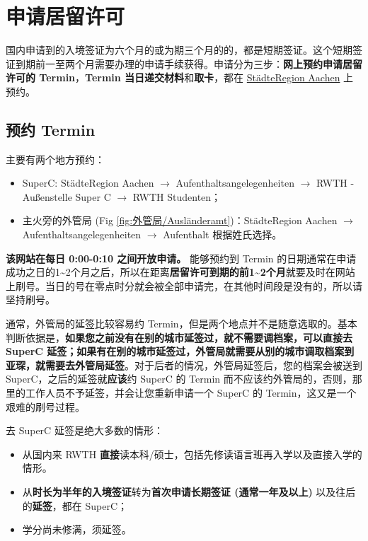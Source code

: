 \section{申请居留许可}\label{sec:申请居留许可}

  国内申请到的入境签证为六个月的或为期三个月的的，都是短期签证。这个短期签证到期前一至两个月需要办理的申请手续获得。申请分为三步：\textbf{网上预约申请居留许可的 Termin}，\textbf{Termin 当日递交材料}和\textbf{取卡}，都在 \href{https://termine.staedteregion-aachen.de/auslaenderamt/}{StädteRegion Aachen} 上预约。

  \subsection{预约 Termin}\label{subsec:预约 Termin}

    主要有两个地方预约：

    \begin{itemize}
      \item SuperC: StädteRegion Aachen $\rightarrow$ Aufenthaltsangelegenheiten $\rightarrow$ RWTH - Außenstelle Super C $\rightarrow$ RWTH Studenten；
      \item 主火旁的外管局 (Fig \ref{fig:外管局/Ausländeramt})：StädteRegion Aachen $\rightarrow$ Aufenthaltsangelegenheiten $\rightarrow$ Aufenthalt 根据姓氏选择。
    \end{itemize}

    \textbf{该网站在每日 0:00-0:10 之间开放申请。} 能够预约到 Termin 的日期通常在申请成功之日的1\textasciitilde2个月之后，所以在距离\textbf{居留许可到期的前1\textasciitilde2个月}就要及时在网站上刷号。当日的号在零点时分就会被全部申请完，在其他时间段是没有的，所以请坚持刷号。

    通常，外管局的延签比较容易约 Termin，但是两个地点并不是随意选取的。基本判断依据是，\textbf{如果您之前没有在别的城市延签过，就不需要调档案，可以直接去 SuperC 延签；如果有在别的城市延签过，外管局就需要从别的城市调取档案到亚琛，就需要去外管局延签}。对于后者的情况，外管局延签后，您的档案会被送到 SuperC，之后的延签就\textbf{应该}约 SuperC 的 Termin 而不应该约外管局的，否则，那里的工作人员不予延签，并会让您重新申请一个 SuperC 的 Termin，这又是一个艰难的刷号过程。

    去 SuperC 延签是绝大多数的情形：

    \begin{itemize}
      \item 从国内来 RWTH \textbf{直接}读本科/硕士，包括先修读语言班再入学以及直接入学的情形。
      \item 从\textbf{时长为半年的入境签证}转为\textbf{首次申请长期签证 (通常一年及以上)} 以及往后的\textbf{延签}，都在 SuperC；
      \item 学分尚未修满，须延签。
    \end{itemize}

